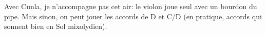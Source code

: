 \tune

Avec Cunla, je n'accompagne pas cet air: le violon joue seul avec un bourdon
du pipe. Mais sinon, on peut jouer les accords de D et C/D (en pratique,
accords qui sonnent bien en Sol mixolydien).

